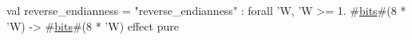 val reverse_endianness = "reverse_endianness" : forall 'W, 'W >= 1. #\hyperref[zbits]{bits}#(8 * 'W) -> #\hyperref[zbits]{bits}#(8 * 'W) effect pure
